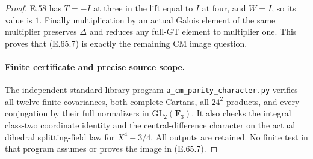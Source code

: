 \begin{proof}
E.58 has $T=-I$ at three in the lift equal to $I$ at four, and
$W=I$, so its value is $1$. Finally multiplication by an actual
Galois element of the same multiplier preserves $\Delta$ and
reduces any full-GT element to multiplier one. This proves that
\textup{(E.65.7)} is exactly the remaining CM image question.

\paragraph{Finite certificate and precise source scope.}
The independent standard-library program
\texttt{a\_cm\_parity\_character.py} verifies all twelve finite
covariances, both complete Cartans, all $24^2$ products, and
every conjugation by their full normalizers in
$\mathrm{GL}_2(\mathbf F_3)$. It also checks the integral
class-two coordinate identity and the central-difference character
on the actual dihedral splitting-field law for $X^4-3/4$.
All outputs are retained. No finite test in that program assumes
or proves the image in \textup{(E.65.7)}.
\end{proof}

